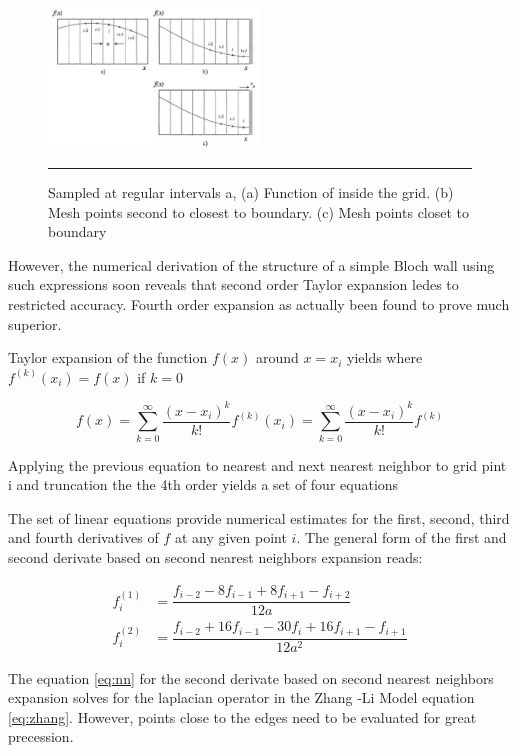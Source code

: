 \begin{figure}[htbp]
	\centering
		\includegraphics[width=0.5\textwidth]{Figures/bound.png}
		\rule{35em}{0.2pt}
	\caption[Sampled at regular intervals a, Taylor expansion]{Sampled at regular intervals a, (a) Function of inside the grid. (b) Mesh points second to closest to boundary. (c) Mesh points closet to boundary}
	\label{fig:bound}
\end{figure}

However, the numerical derivation of the structure of a simple Bloch wall using such expressions soon reveals that second order Taylor expansion ledes to restricted accuracy. Fourth order expansion as actually been found to prove much superior.  \cite{methods}

Taylor expansion of the function $f(x)$ around $x=x_i$ yields where $f^{(k)}(x_i) = f(x)$ if $k=0$

$$f(x) = \sum\limits_{k=0}^{\infty} \dfrac{(x-x_i)^k}{k!}f^{(k)}(x_i) = \sum\limits_{k=0}^{\infty} \dfrac{(x-x_i)^k}{k!}f^{(k)}$$

Applying the previous equation to nearest and next nearest neighbor to grid pint i and truncation the the 4th order yields a set of four equations

The set of linear equations provide numerical estimates for the first, second, third and fourth derivatives of $f$ at any given point $i$. The general form of the first and second derivate based on second nearest neighbors expansion reads:

\begin{align} \label{eq:nn}
f^{(1)}_i &= \dfrac{f_{i-2}-8f_{i-1} + 8f_{i+1} - f_{i+2}}{12a} \\
f^{(2)}_i &= \dfrac{f_{i-2}+16f_{i-1} -30f_{i} + 16f_{i+1} - f_{i+1}}{12a^2}
\end{align}

The equation \ref{eq:nn} for the second derivate based on second nearest neighbors expansion solves for the laplacian operator in the Zhang -Li Model equation \ref{eq:zhang}. However, points close to the edges need to be evaluated for great precession. 

